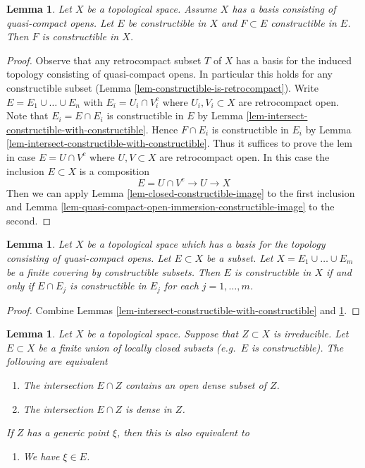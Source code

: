 \documentclass{ujarticle}
\newtheorem{lem}[thm]{Lemma}
\begin{document}
\begin{lem}
\label{lem-constructible-in-constructible}
Let $X$ be a topological space. Assume
$X$ has a basis consisting of quasi-compact opens.
Let $E$ be constructible in $X$ and $F \subset E$ constructible in $E$.
Then $F$ is constructible in $X$.
\end{lem}

\begin{proof}
Observe that any retrocompact subset $T$ of $X$ has a basis for the induced
topology consisting of quasi-compact opens. In particular this holds
for any constructible subset
(Lemma \ref{lem-constructible-is-retrocompact}).
Write $E = E_1 \cup \ldots \cup E_n$ with $E_i = U_i \cap V_i^c$
where $U_i, V_i \subset X$ are retrocompact open.
Note that $E_i = E \cap E_i$ is constructible in $E$ by
Lemma \ref{lem-intersect-constructible-with-constructible}.
Hence $F \cap E_i$ is constructible in $E_i$ by
Lemma \ref{lem-intersect-constructible-with-constructible}.
Thus it suffices to prove the lem in case $E = U \cap V^c$
where $U, V \subset X$ are retrocompact open.
In this case the inclusion $E \subset X$ is a composition
$$
E = U \cap V^c \to U \to X
$$
Then we can apply Lemma \ref{lem-closed-constructible-image}
to the first inclusion and
Lemma \ref{lem-quasi-compact-open-immersion-constructible-image}
to the second.
\end{proof}

\begin{lem}
\label{lem-collate-constructible-from-constructible}
Let $X$ be a topological space which has a basis for the topology
consisting of quasi-compact opens. Let $E \subset X$ be a subset.
Let $X = E_1 \cup \ldots \cup E_m$ be a finite covering by constructible
subsets. Then $E$ is constructible in $X$ if and only if $E \cap E_j$
is constructible in $E_j$ for each $j = 1, \ldots, m$.
\end{lem}

\begin{proof}
Combine
Lemmas \ref{lem-intersect-constructible-with-constructible} and
\ref{lem-constructible-in-constructible}.
\end{proof}

\begin{lem}
\label{lem-generic-point-in-constructible}
Let $X$ be a topological space. Suppose that
$Z \subset X$ is irreducible. Let $E \subset X$
be a finite union of locally closed subsets (e.g.\ $E$
is constructible). The following are equivalent
\begin{enumerate}
\item The intersection $E \cap Z$ contains an open
dense subset of $Z$.
\item The intersection $E \cap Z$ is dense in $Z$.
\end{enumerate}
If $Z$ has a generic point $\xi$, then this is
also equivalent to
\begin{enumerate}
\item[(3)] We have $\xi \in E$.
\end{enumerate}
\end{lem}
\end{document}
